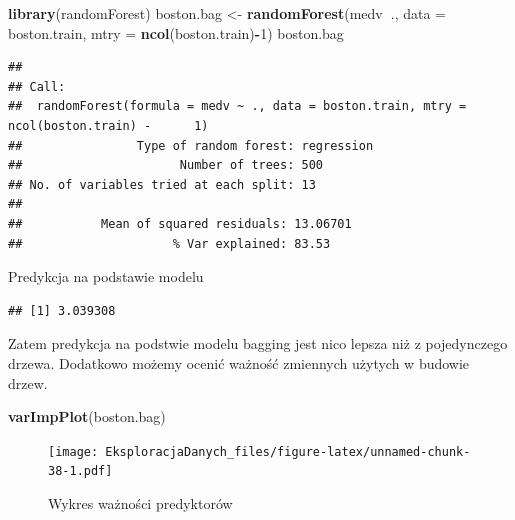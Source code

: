 \documentclass[]{book}
\newenvironment{Shaded}{\begin{snugshade}}{\end{snugshade}}
\newcommand{\DataTypeTok}[1]{\textcolor[rgb]{0.13,0.29,0.53}{#1}}
\newcommand{\DecValTok}[1]{\textcolor[rgb]{0.00,0.00,0.81}{#1}}
\newcommand{\KeywordTok}[1]{\textcolor[rgb]{0.13,0.29,0.53}{\textbf{#1}}}
\newcommand{\NormalTok}[1]{#1}
\newcommand{\OperatorTok}[1]{\textcolor[rgb]{0.81,0.36,0.00}{\textbf{#1}}}
\newcommand{\StringTok}[1]{\textcolor[rgb]{0.31,0.60,0.02}{#1}}
\theoremstyle{plain}
\theoremstyle{definition}
\begin{document}
\begin{Shaded}
\begin{Highlighting}[]
\KeywordTok{library}\NormalTok{(randomForest)}
\NormalTok{boston.bag <-}\StringTok{ }\KeywordTok{randomForest}\NormalTok{(medv}\OperatorTok{~}\NormalTok{., }\DataTypeTok{data =}\NormalTok{ boston.train, }
                           \DataTypeTok{mtry =} \KeywordTok{ncol}\NormalTok{(boston.train)}\OperatorTok{-}\DecValTok{1}\NormalTok{)}
\NormalTok{boston.bag}
\end{Highlighting}
\end{Shaded}

\begin{verbatim}
## 
## Call:
##  randomForest(formula = medv ~ ., data = boston.train, mtry = ncol(boston.train) -      1) 
##                Type of random forest: regression
##                      Number of trees: 500
## No. of variables tried at each split: 13
## 
##           Mean of squared residuals: 13.06701
##                     % Var explained: 83.53
\end{verbatim}

Predykcja na podstawie modelu

\begin{Shaded}
\end{Shaded}

\begin{verbatim}
## [1] 3.039308
\end{verbatim}

Zatem predykcja na podstwie modelu bagging jest nico lepsza niż z pojedynczego drzewa. Dodatkowo możemy ocenić ważność zmiennych użytych w budowie drzew.

\begin{Shaded}
\begin{Highlighting}[]
\KeywordTok{varImpPlot}\NormalTok{(boston.bag)}
\end{Highlighting}
\end{Shaded}

\begin{figure}
\centering
\texttt{[image: EksploracjaDanych\_files/figure-latex/unnamed-chunk-38-1.pdf]}
\caption{\label{fig:unnamed-chunk-38}Wykres ważności predyktorów}
\end{figure}
\end{document}
